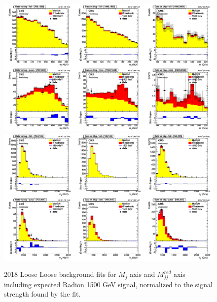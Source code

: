 \begin{figure}[!htb]
	\centering
	\includegraphics[width=1\textwidth]{Figures/postfit_projx_fits_18LL.png}
	\includegraphics[width=1\textwidth]{Figures/postfit_projy_fits_18LL.png}
	\caption{2018 Loose Loose background fits for $M_j$ axis and $M_{jj}^{red}$ axis including expected Radion 1500 GeV signal, normalized to the signal strength found by the fit.}
	\label{fig:18LL}
\end{figure}
